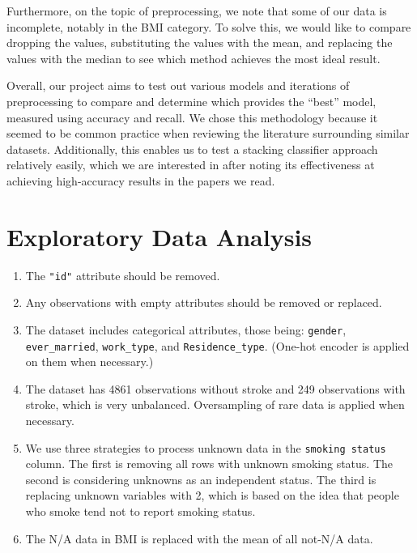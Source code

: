 \documentclass[11pt]{article}
\begin{document}
\medskip
Furthermore, on the topic of preprocessing, we note that some of our data is incomplete, notably in the BMI category. To solve this, we would like to compare dropping the values, substituting the values with the mean, and replacing the values with the median to see which method achieves the most ideal result.

\medskip
Overall, our project aims to test out various models and iterations of preprocessing to compare and determine which provides the “best” model, measured using accuracy and recall. We chose this methodology because it seemed to be common practice when reviewing the literature surrounding similar datasets. Additionally, this enables us to test a stacking classifier approach relatively easily, which we are interested in after noting its effectiveness at achieving high-accuracy results in the papers we read.

\section*{Exploratory Data Analysis}

\begin{enumerate}
    \item The \texttt{"id"} attribute should be removed.
    \item Any observations with empty attributes should be removed or replaced.
    \item The dataset includes categorical attributes, those being: \texttt{gender}, \texttt{ever\_married}, \texttt{work\_type}, and \texttt{Residence\_type}. (One-hot encoder is applied on them when necessary.)
    \item The dataset has 4861 observations without stroke and 249 observations with stroke, which is very unbalanced. Oversampling of rare data is applied when necessary.
    \item We use three strategies to process unknown data in the \texttt{smoking status} column. The first is removing all rows with unknown smoking status. The second is considering unknowns as an independent status. The third is replacing unknown variables with 2, which is based on the idea that people who smoke tend not to report smoking status.
    \item The N/A data in BMI is replaced with the mean of all not-N/A data.
\end{enumerate}
\end{document}

